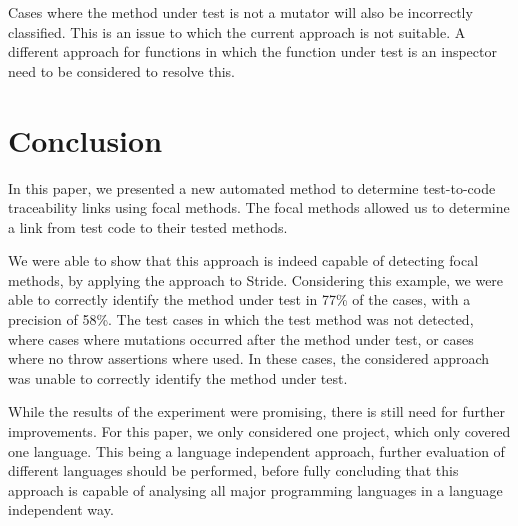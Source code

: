 \documentclass[11pt]{article}
\begin{document}
\begin{multicols}{2}
Cases where the method under test is not a mutator will also be incorrectly classified. This is an issue to which the current approach is not suitable. A different approach for functions in which the function under test is an inspector need to be considered to resolve this.

\section{Conclusion}
In this paper, we presented a new automated method to determine test-to-code traceability links using focal methods. The focal methods allowed us to determine a link from test code to their tested methods.

We were able to show that this approach is indeed capable of detecting focal methods, by applying the approach to Stride. Considering this example, we were able to correctly identify the method under test in 77\% of the cases, with a precision of 58\%. The test cases in which the test method was not detected, where cases where mutations occurred after the method under test, or cases where no throw assertions where used. In these cases, the considered approach was unable to correctly identify the method under test.

While the results of the experiment were promising, there is still need for further improvements. For this paper, we only considered one project, which only covered one language. This being a language independent approach, further evaluation of different languages should be performed, before fully concluding that this approach is capable of analysing all major programming languages in a language independent way.

\printbibliography
\end{multicols}
\end{document}
